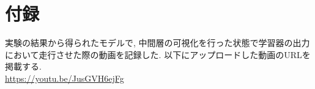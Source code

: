 \chapter*{付録}


実験の結果から得られたモデルで, 中間層の可視化を行った状態で学習器の出力において走行させた際の動画を記録した. 以下にアップロードした動画のURLを掲載する.\\
\url{https://youtu.be/JusGVH6ejFg}